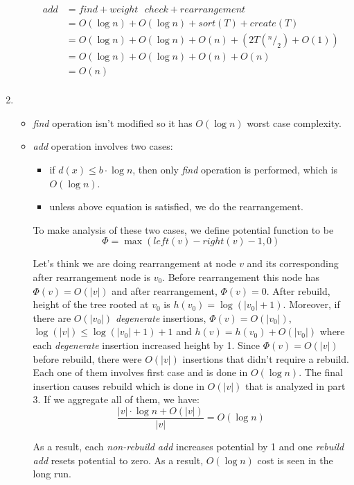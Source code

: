 \begin{enumerate}
\begin{itemize}
    \begin{align*}
      add &= find + weight\text{ }check + rearrangement \\
                  &= O(\log n) + O(\log n) + sort(T) + create(T) \\
                  &= O(\log n) + O(\log n)+ O(n) + (2T(^n/_2) + O(1)) \\
                  &= O(\log n) + O(\log n)+ O(n) + O(n) \\
                  &= O(n) \\
    \end{align*}
  \end{itemize}
  
  \item
  \begin{itemize}
    \item \textit{find} operation isn't modified so it has $O( \log n)$ worst case complexity.
    
    \item \textit{add} operation involves two cases:
      \begin{itemize}
        \item if $d(x) \leq b \cdot \log n$, then only \textit{find} operation is performed, which is $O(\log n)$.
        
        \item unless above equation is satisfied, we do the rearrangement.
      \end{itemize}
      
      To make analysis of these two cases, we define potential function to be 
      $$\Phi = \max (left(v) - right(v) - 1, 0)$$
      
      Let's think we are doing rearrangement at node $v$ and its corresponding after rearrangement node is $v_0$. Before rearrangement this node has $\Phi(v) = O(|v|)$ and after rearrangement, $\Phi(v) = 0$. 
      After rebuild, height of the tree rooted at $v_0$ is $h(v_0) = \log(|v_0| + 1)$. Moreover, if there are $O(|v_0|)$ \textit{degenerate} insertions, $\Phi(v) = O(|v_0|)$, $\log(|v|) \leq \log(|v_0| + 1) + 1$ and $h(v) = h(v_0) + O(|v_0|)$ where each \textit{degenerate} insertion increased height by 1. Since $\Phi(v) = O(|v|)$ before rebuild, there were $O(|v|)$ insertions that didn't require a rebuild. Each one of them involves first case and is done in $O(\log n)$. The final insertion causes rebuild which is done in $O(|v|)$ that is analyzed in part 3. If we aggregate all of them, we have:      
      $$
        \frac{|v| \cdot \log n + O(|v|)}{|v|} = O(\log n)      
      $$
      
      As a result, each \textit{non-rebuild add} increases potential by 1 and one \textit{rebuild add} resets potential to zero. As a result, $O(\log n)$ cost is seen in the long run.
  \end{itemize}


\end{enumerate}